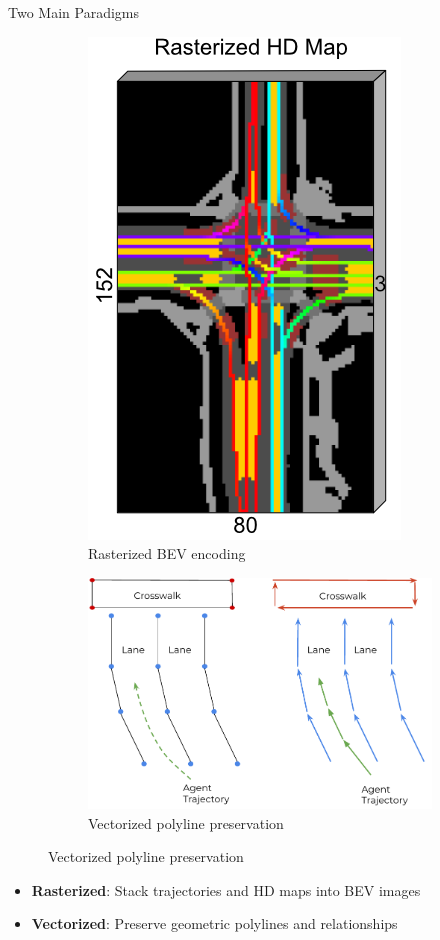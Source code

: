 \documentclass[10pt,aspectratio=169]{beamer}
\begin{document}
\begin{frame}{Two Main Paradigms}
\begin{figure}[H]
\centering
\begin{subfigure}[t]{0.45\textwidth}
    \centering
    \includegraphics[width=0.6\columnwidth,height=0.5\textheight,keepaspectratio]{docs/latex/figures/caspnet-bev-repr.png}
    \caption{Rasterized BEV encoding~\cite{caspnetSchäfer2022}}
    \label{fig:rasterized}
\end{subfigure}
\hfill
\begin{subfigure}[t]{0.5\textwidth}
    \centering
    \includegraphics[width=0.6\columnwidth,height=0.5\textheight,keepaspectratio]{docs/latex/figures/vectornet-2020-vector-repr.pdf}
    \caption{Vectorized polyline preservation~\cite{gao2020vectornet}}
    \label{fig:vectorized}
\end{subfigure}
\end{figure}

\vspace{0.5em}
\begin{itemize}
    \item \textbf{Rasterized}: Stack trajectories and HD maps into BEV images
    \item \textbf{Vectorized}: Preserve geometric polylines and relationships
\end{itemize}
\end{frame}
\end{document}
